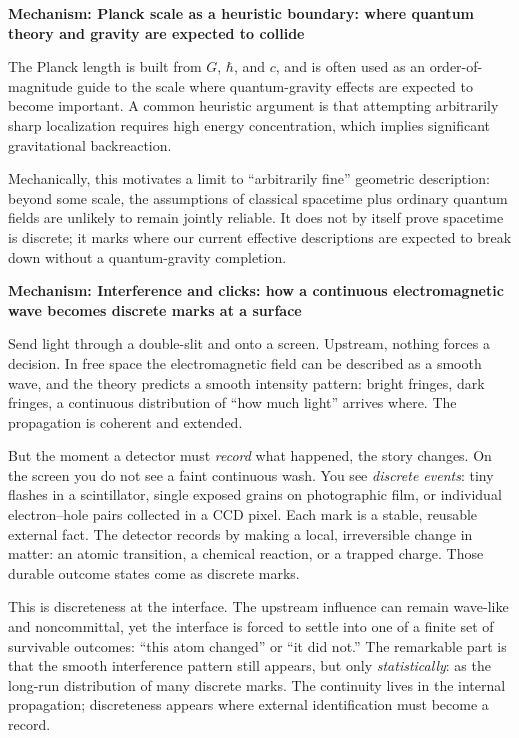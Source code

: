 \documentclass[11pt,twoside,openright]{book}
\newenvironment{mechanismbox}[1]
  {\begin{framed}\noindent\textbf{Mechanism: #1}\par\medskip}
  {\end{framed}}
\begin{document}
\begin{mechanismbox}{Planck scale as a heuristic boundary: where quantum theory and gravity are expected to collide}
The Planck length is built from $G$, $\hbar$, and $c$, and is often used as an order-of-magnitude guide to the scale where quantum-gravity effects are expected to become important.
A common heuristic argument is that attempting arbitrarily sharp localization requires high energy concentration, which implies significant gravitational backreaction.

Mechanically, this motivates a limit to ``arbitrarily fine'' geometric description: beyond some scale, the assumptions of classical spacetime plus ordinary quantum fields are unlikely to remain jointly reliable.
It does not by itself prove spacetime is discrete; it marks where our current effective descriptions are expected to break down without a quantum-gravity completion.
\end{mechanismbox}
\begin{mechanismbox}{Interference and clicks: how a continuous electromagnetic wave becomes discrete marks at a surface}
Send light through a double-slit and onto a screen. Upstream, nothing forces a decision. In free space the electromagnetic field can be described as a smooth wave, and the theory predicts a smooth intensity pattern: bright fringes, dark fringes, a continuous distribution of ``how much light'' arrives where. The propagation is coherent and extended.

But the moment a detector must \emph{record} what happened, the story changes. On the screen you do not see a faint continuous wash. You see \emph{discrete events}: tiny flashes in a scintillator, single exposed grains on photographic film, or individual electron--hole pairs collected in a CCD pixel. Each mark is a stable, reusable external fact. The detector records by making a local, irreversible change in matter: an atomic transition, a chemical reaction, or a trapped charge. Those durable outcome states come as discrete marks.

This is discreteness at the interface. The upstream influence can remain wave-like and noncommittal, yet the interface is forced to settle into one of a finite set of survivable outcomes: ``this atom changed'' or ``it did not.'' The remarkable part is that the smooth interference pattern still appears, but only \emph{statistically}: as the long-run distribution of many discrete marks. The continuity lives in the internal propagation; discreteness appears where external identification must become a record.
\end{mechanismbox}
\end{document}
